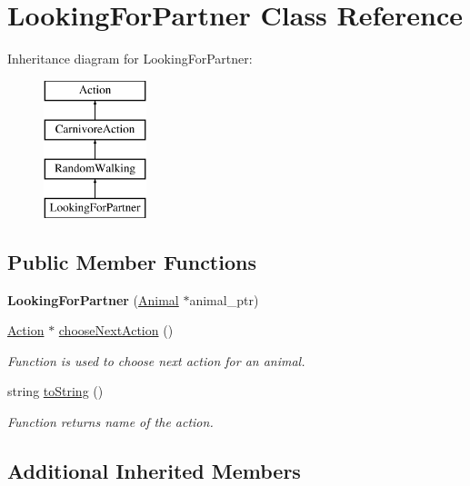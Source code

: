 \hypertarget{class_looking_for_partner}{}\section{Looking\+For\+Partner Class Reference}
\label{class_looking_for_partner}
Inheritance diagram for Looking\+For\+Partner\+:\begin{figure}[H]
\begin{center}
\leavevmode
\includegraphics[height=4.000000cm]{class_looking_for_partner}
\end{center}
\end{figure}
\subsection*{Public Member Functions}
\begin{DoxyCompactItemize}
\item 
\hypertarget{class_looking_for_partner_a52b41dd23b47cdeae8ba927b50aa9403}{}{\bfseries Looking\+For\+Partner} (\hyperlink{class_animal}{Animal} $\ast$animal\+\_\+ptr)\label{class_looking_for_partner_a52b41dd23b47cdeae8ba927b50aa9403}

\item 
\hyperlink{class_action}{Action} $\ast$ \hyperlink{class_looking_for_partner_abd76956136014399c37f8f62c0510795}{choose\+Next\+Action} ()
\begin{DoxyCompactList}\small\item\em Function is used to choose next action for an animal. \end{DoxyCompactList}\item 
string \hyperlink{class_looking_for_partner_a83ef295e8ae6ff29521e0225683bf0af}{to\+String} ()
\begin{DoxyCompactList}\small\item\em Function returns name of the action. \end{DoxyCompactList}\end{DoxyCompactItemize}
\subsection*{Additional Inherited Members}


